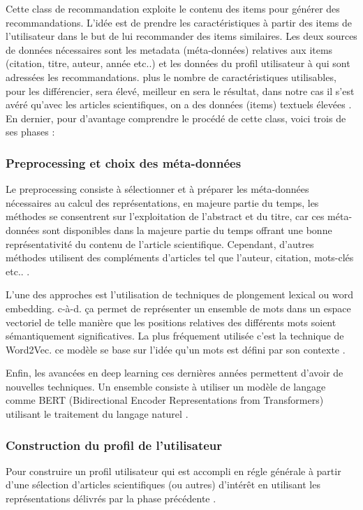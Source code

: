 	\par Cette class de recommandation exploite le contenu des items pour générer des recommandations. L'idée est de prendre les caractéristiques à partir des items de l'utilisateur dans le but de lui recommander des items similaires. Les deux sources de données nécessaires sont les metadata (méta-données) relatives aux items (citation, titre, auteur, année etc..) et les données du profil utilisateur à qui sont adressées les recommandations. plus le nombre de caractéristiques utilisables, pour les différencier, sera élevé, meilleur en sera le résultat, dans notre cas il s'est avéré qu'avec les articles scientifiques, on a des données (items) textuels élevées \cite{ch1ref15}. En dernier, pour d'avantage comprendre le procédé de cette class, voici trois de ses phases : 

        \subsubsection{Preprocessing et choix des méta-données}
        \par Le preprocessing consiste à sélectionner et à préparer les méta-données nécessaires au calcul des représentations, en majeure partie du temps, les méthodes se consentrent sur l'exploitation de l'abstract et du titre, car ces méta-données sont disponibles dans la majeure partie du temps offrant une bonne représentativité du contenu de l'article scientifique. Cependant, d’autres méthodes utilisent des compléments d'articles tel que l'auteur, citation, mots-clés etc.. \cite{ch1ref15}.
        
        \par L'une des approches est l'utilisation de techniques de plongement lexical ou word embedding. c-à-d. ça permet de représenter un ensemble de mots dans un espace vectoriel de telle manière que les positions relatives des différents mots soient sémantiquement significatives. La plus fréquement utilisée c'est la technique de Word2Vec. ce modèle se base sur l'idée qu'un mots est défini par son contexte \cite{ch1ref15}.
        
    
        \par Enfin, les avancées en deep learning ces dernières années permettent d'avoir de nouvelles techniques. Un ensemble consiste à utiliser un modèle de langage comme BERT (Bidirectional Encoder Representations from Transformers) utilisant le traitement du langage naturel \cite{ch1ref15}. 
    
        \subsubsection{Construction du profil de l’utilisateur}
        \par Pour construire un profil utilisateur qui est accompli en régle générale à partir d'une sélection d'articles scientifiques (ou autres) d'intérêt en utilisant les représentations délivrés par la phase précédente \cite{ch1ref15}. 
    
